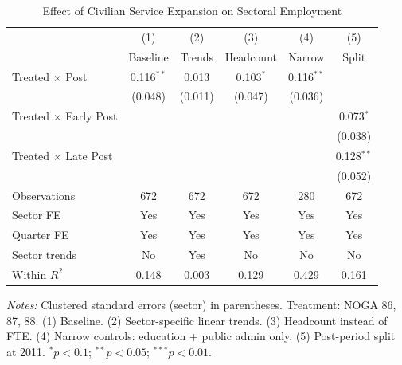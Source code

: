 \begin{table}[htbp]
\centering
\caption{Effect of Civilian Service Expansion on Sectoral Employment}
\label{tab:main}
\begin{threeparttable}
\begin{tabular}{lccccc}
\toprule
 & (1) & (2) & (3) & (4) & (5) \\
 & Baseline & Trends & Headcount & Narrow & Split \\
\midrule
Treated $\times$ Post & 0.116$^{**}$ & 0.013 & 0.103$^{*}$ & 0.116$^{**}$ & \\
 & (0.048) & (0.011) & (0.047) & (0.036) & \\
Treated $\times$ Early Post & & & & & 0.073$^{*}$ \\
 & & & & & (0.038) \\
Treated $\times$ Late Post & & & & & 0.128$^{**}$ \\
 & & & & & (0.052) \\
\midrule
Observations & 672 & 672 & 672 & 280 & 672 \\
Sector FE & Yes & Yes & Yes & Yes & Yes \\
Quarter FE & Yes & Yes & Yes & Yes & Yes \\
Sector trends & No & Yes & No & No & No \\
Within $R^2$ & 0.148 & 0.003 & 0.129 & 0.429 & 0.161 \\
\bottomrule
\end{tabular}
\begin{tablenotes}[flushleft]\small
\item \textit{Notes:} Clustered standard errors (sector) in parentheses. Treatment: NOGA 86, 87, 88. (1) Baseline. (2) Sector-specific linear trends. (3) Headcount instead of FTE. (4) Narrow controls: education + public admin only. (5) Post-period split at 2011. $^{*}p<0.1$; $^{**}p<0.05$; $^{***}p<0.01$.
\end{tablenotes}
\end{threeparttable}
\end{table}
